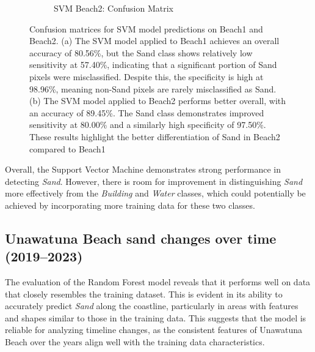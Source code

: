 \documentclass[a4paper,12pt]{article}
\begin{document}
\begin{figure}[H]
\begin{subfigure}[b]{0.48\linewidth}
        \caption{SVM Beach2: Confusion Matrix}
        \label{fig:rf_training_sand}
    \end{subfigure}
    \caption[Spatial Distribution of sand pixels detected by the Random Forest model for the years 2019 to 2023]{Confusion matrices for SVM model predictions on Beach1 and Beach2.
(a) The SVM model applied to Beach1 achieves an overall accuracy of 80.56\%, but the Sand class shows relatively low sensitivity at 57.40\%, indicating that a significant portion of Sand pixels were misclassified. Despite this, the specificity is high at 98.96\%, meaning non-Sand pixels are rarely misclassified as Sand.
(b) The SVM model applied to Beach2 performs better overall, with an accuracy of 89.45\%. The Sand class demonstrates improved sensitivity at 80.00\% and a similarly high specificity of 97.50\%. These results highlight the better differentiation of Sand in Beach2 compared to Beach1}
    \label{fig:rf_comparisonb}
\end{figure}

Overall, the Support Vector Machine demonstrates strong performance in detecting \textit{Sand}. However, there is room for improvement in distinguishing \textit{Sand} more effectively from the \textit{Building} and \textit{Water} classes, which could potentially be achieved by incorporating more training data for these two classes.


\subsection{Unawatuna Beach sand changes over time (2019–2023)}
The evaluation of the Random Forest model  reveals that it performs well on data that closely resembles the training dataset. This is evident in its ability to accurately predict \textit{Sand} along the coastline, particularly in areas with features and shapes similar to those in the training data. This suggests that the model is reliable for analyzing timeline changes, as the consistent features of Unawatuna Beach over the years align well with the training data characteristics.
\end{document}

